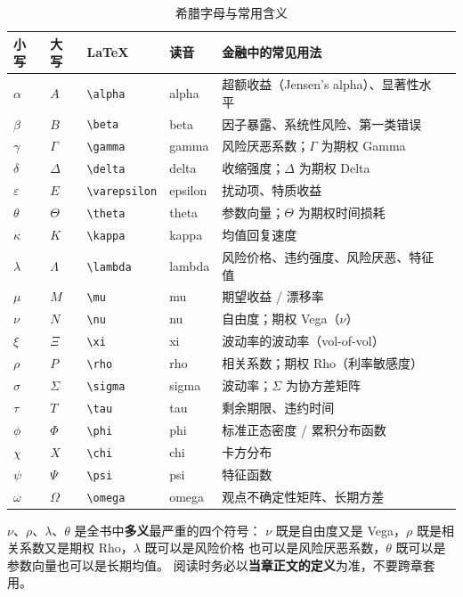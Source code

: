 \begin{table}[htbp]
\centering
\caption{希腊字母与常用含义}\label{tab:greek}
\tablefont
\begin{tabular}{@{}llllll@{}}
\toprule
小写 & 大写 & \LaTeX & 读音 & 金融中的常见用法 \\
\midrule
$\alpha$ & $A$ & \verb|\alpha| & alpha & 超额收益（Jensen's alpha）、显著性水平 \\
$\beta$ & $B$ & \verb|\beta| & beta & 因子暴露、系统性风险、第一类错误 \\
$\gamma$ & $\Gamma$ & \verb|\gamma| & gamma & 风险厌恶系数；$\Gamma$ 为期权 Gamma \\
$\delta$ & $\Delta$ & \verb|\delta| & delta & 收缩强度；$\Delta$ 为期权 Delta \\
$\varepsilon$ & $E$ & \verb|\varepsilon| & epsilon & 扰动项、特质收益 \\
$\theta$ & $\Theta$ & \verb|\theta| & theta & 参数向量；$\Theta$ 为期权时间损耗 \\
$\kappa$ & $K$ & \verb|\kappa| & kappa & 均值回复速度 \\
$\lambda$ & $\Lambda$ & \verb|\lambda| & lambda & 风险价格、违约强度、风险厌恶、特征值 \\
$\mu$ & $M$ & \verb|\mu| & mu & 期望收益 / 漂移率 \\
$\nu$ & $N$ & \verb|\nu| & nu & 自由度；期权 Vega（$\nu$） \\
$\xi$ & $\Xi$ & \verb|\xi| & xi & 波动率的波动率（vol-of-vol） \\
$\rho$ & $P$ & \verb|\rho| & rho & 相关系数；期权 Rho（利率敏感度） \\
$\sigma$ & $\Sigma$ & \verb|\sigma| & sigma & 波动率；$\Sigma$ 为协方差矩阵 \\
$\tau$ & $T$ & \verb|\tau| & tau & 剩余期限、违约时间 \\
$\phi$ & $\Phi$ & \verb|\phi| & phi & 标准正态密度 / 累积分布函数 \\
$\chi$ & $X$ & \verb|\chi| & chi & 卡方分布 \\
$\psi$ & $\Psi$ & \verb|\psi| & psi & 特征函数 \\
$\omega$ & $\Omega$ & \verb|\omega| & omega & 观点不确定性矩阵、长期方差 \\
\bottomrule
\end{tabular}
\end{table}

\begin{warningbox}
$\nu$、$\rho$、$\lambda$、$\theta$ 是全书中\textbf{多义}最严重的四个符号：
$\nu$ 既是自由度又是 Vega，$\rho$ 既是相关系数又是期权 Rho，$\lambda$ 既可以是风险价格
也可以是风险厌恶系数，$\theta$ 既可以是参数向量也可以是长期均值。
阅读时务必以\textbf{当章正文的定义}为准，不要跨章套用。
\end{warningbox}


